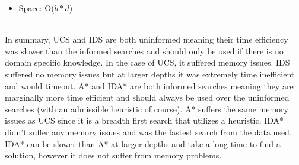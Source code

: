 \documentclass{article}
\newcommand*\fixindent{ \hspace{1pt}\\}
\begin{document}
\begin{enumerate}[a)]
\begin{itemize}
            \item Space: O($b*d$)
        \end{itemize}
    \fixindent{}
    In summary, UCS and IDS are both uninformed meaning their time efficiency was slower than the informed searches and should only be used if there is no domain specific knowledge. In the case of UCS, it suffered memory issues. IDS  suffered no memory issues but at larger depths it was extremely time inefficient and would timeout. A* and IDA* are both informed searches meaning they are marginally more time efficient and should always be used over the uninformed searches (with an admissible heuristic of course). A* suffers the same memory issues as UCS since it is a breadth first search that utilizes a heuristic. IDA* didn’t suffer any memory issues and was the fastest search from the data used. IDA* can be slower than A* at larger depths and take a long time to find a solution, however it does not suffer from memory problems. 
\end{enumerate}

\newpage
\end{document}
